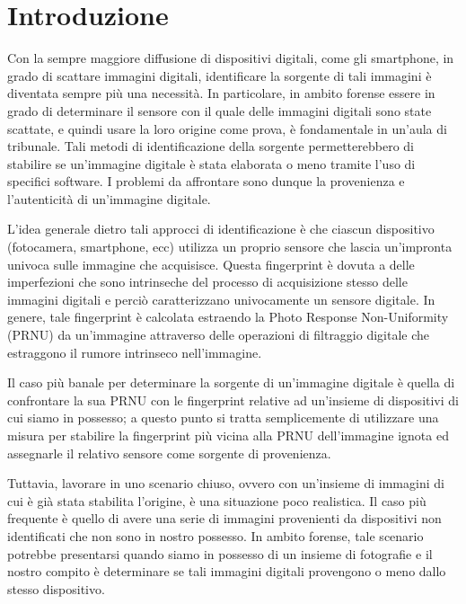 \section{Introduzione}

Con la sempre maggiore diffusione di dispositivi digitali, come gli smartphone, in grado di scattare immagini digitali, identificare la sorgente di tali immagini è diventata sempre più una necessità. In particolare, in ambito forense essere in grado di determinare il sensore con il quale delle immagini digitali sono state scattate, e quindi usare la loro origine come prova, è fondamentale in un'aula di tribunale. Tali metodi di identificazione della sorgente permetterebbero di stabilire se un'immagine digitale è stata elaborata o meno tramite l'uso di specifici software. I problemi da affrontare sono dunque la provenienza e l'autenticità di un'immagine digitale.

L'idea generale dietro tali approcci di identificazione è che ciascun dispositivo (fotocamera, smartphone, ecc) utilizza un proprio sensore che lascia un'impronta univoca sulle immagine che acquisisce. Questa fingerprint è dovuta a delle imperfezioni che sono intrinseche del processo di acquisizione stesso delle immagini digitali e perciò caratterizzano univocamente un sensore digitale. In genere, tale fingerprint è calcolata estraendo la Photo Response Non-Uniformity (PRNU) da un'immagine attraverso delle operazioni di filtraggio digitale che estraggono il rumore intrinseco nell'immagine.

Il caso più banale per determinare la sorgente di un'immagine digitale è quella di confrontare la sua PRNU con le fingerprint relative ad un'insieme di dispositivi di cui siamo in possesso; a questo punto si tratta semplicemente di utilizzare una misura per stabilire la fingerprint più vicina alla PRNU dell'immagine ignota ed assegnarle il relativo sensore come sorgente di provenienza.

Tuttavia, lavorare in uno scenario chiuso, ovvero con un'insieme di immagini di cui è già stata stabilita l'origine, è una situazione poco realistica. Il caso più frequente è quello di avere una serie di immagini provenienti da dispositivi non identificati che non sono in nostro possesso. In ambito forense, tale scenario potrebbe presentarsi quando siamo in possesso di un insieme di fotografie e il nostro compito è determinare se tali immagini digitali provengono o meno dallo stesso dispositivo.

